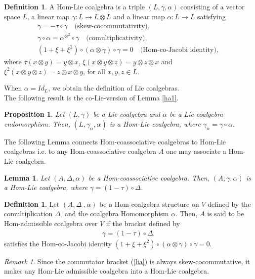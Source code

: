 \documentclass{article}
\newtheorem{lem}[thm]{Lemma}
\newtheorem{prop}[thm]{Proposition}
\theoremstyle{definition}
\newtheorem{defn}[thm]{Definition}
\theoremstyle{remark}
\newtheorem{rem}[thm]{Remark}
\numberwithin{equation}{section}
\begin{document}
\begin{defn}\label{hplad}
A Hom-Lie coalgebra is a triple $(L,\gamma, \alpha)$ consisting of a vector space $L$, a linear map
 $\gamma : L\longrightarrow L\otimes L$ and a linear map $\alpha :L\longrightarrow L$ satisfying 
 \begin{eqnarray}
  \gamma=-\tau\circ\gamma\quad \mbox{(skew-cocommutativity)},\\
 \gamma\circ\alpha= \alpha^{\otimes^{2}}\circ\gamma\quad \mbox{(comultiplicativity)},\\
(1+\xi+\xi^2)\circ(\alpha\otimes\gamma)\circ\gamma=0\quad \mbox{(Hom-co-Jacobi identity)},
 \end{eqnarray}
where $\tau(x\otimes y)=y\otimes x$, $\xi(x\otimes y\otimes z)=y\otimes z\otimes x$ and $\xi^2(x\otimes y\otimes z)=z\otimes x\otimes y$, for all $x, y, z\in L$.
\end{defn}
When $\alpha=Id_L$, we obtain the definition of Lie coalgebras.\\

The following result is the co-Lie-version of Lemma \ref{ha1}.
\begin{prop}\label{Amb}
 Let $(L,\gamma)$ be a Lie coalgebra and $\alpha$ be a Lie coalgebra endomorphism.  Then, $(L,\gamma_\alpha,\alpha)$
 is a Hom-Lie coalgebra, where $\gamma_\alpha=\gamma\circ\alpha$.
\end{prop}

The following Lemma connects Hom-coassociative coalgebras to Hom-Lie coalgebras i.e. to any Hom-coassociative
coalgebra $A$ one may associate a Hom-Lie coalgebra.
\begin{lem}\label{Am1}
 Let $(A,\Delta,\alpha)$ be a Hom-coassociative coalgebra. Then, $(A, \gamma,\alpha)$ is a Hom-Lie coalgebra, where
 $\gamma=(1-\tau)\circ\Delta$.
\end{lem}
\begin{defn}
 Let $(A, \Delta_\cdot, \alpha)$ be a Hom-coalgebra structure on $V$ defined by the comultiplication $\Delta_\cdot$ and the coalgebra Homomorphism $\alpha$. Then, $A$ is said to
be Hom-admissible coalgebra over $V$ if the bracket defined  by
\begin{eqnarray}
 \gamma = (1-\tau)\circ\Delta_\cdot \label{lia}
\end{eqnarray}
satisfies the Hom-co-Jacobi identity $ (1+\xi+\xi^2)\circ(\alpha\otimes\gamma)\circ\gamma=0$.
\end{defn}
\begin{rem}
Since the commutator bracket (\ref{lia}) is always skew-cocommutative, it makes any Hom-Lie admissible coalgebra into a Hom-Lie coalgebra.
\end{rem}
\end{document}

